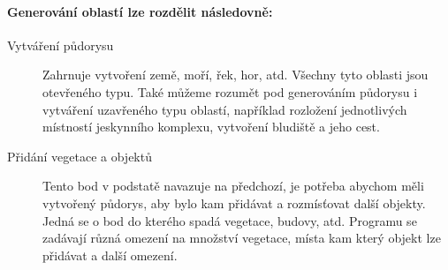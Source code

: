 \paragraph*{Generování oblastí lze rozdělit následovně:}
\begin{description}
	\item[Vytváření půdorysu] Zahrnuje vytvoření země, moří, řek, hor, atd. Všechny tyto oblasti jsou otevřeného typu. Také můžeme rozumět pod generováním půdorysu i vytváření uzavřeného typu oblastí, například rozložení jednotlivých místností jeskynního komplexu, vytvoření bludiště a jeho cest. 
	
	\item[Přidání vegetace a objektů] Tento bod v podstatě navazuje na předchozí, je potřeba abychom měli vytvořený půdorys, aby bylo kam přidávat a rozmísťovat další objekty. Jedná se o bod do kterého spadá vegetace, budovy, atd. Programu se zadávají různá omezení na množství vegetace, místa kam který objekt lze přidávat a další omezení.
\end{description} 

